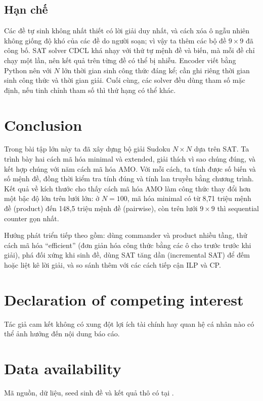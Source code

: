 \documentclass[a4paper,fleqn]{cas-sc}
\newcommand{\GithubURL}{}
\begin{document}
\subsection{Hạn chế}\label{sec:threats}

Các đề tự sinh không nhất thiết có lời giải duy nhất, và cách xóa ô ngẫu nhiên không giống độ khó của các đề do người soạn; vì vậy ta thêm các bộ đề $9\times9$ đã công bố. SAT solver CDCL khá nhạy với thứ tự mệnh đề và biến, mà mỗi đề chỉ chạy một lần, nên kết quả trên từng đề có thể bị nhiễu. Encoder viết bằng Python nên với $N$ lớn thời gian sinh công thức đáng kể; cần ghi riêng thời gian sinh công thức và thời gian giải. Cuối cùng, các solver đều dùng tham số mặc định, nếu tinh chỉnh tham số thì thứ hạng có thể khác.

\section{Conclusion}\label{sec:conclusion}

Trong bài tập lớn này ta đã xây dựng bộ giải Sudoku $N\times N$ dựa trên SAT. Ta trình bày hai cách mã hóa minimal và extended, giải thích vì sao chúng đúng, và kết hợp chúng với năm cách mã hóa AMO. Với mỗi cách, ta tính được số biến và số mệnh đề, đồng thời kiểm tra tính đúng và tính lan truyền bằng chương trình. Kết quả về kích thước cho thấy cách mã hóa AMO làm công thức thay đổi hơn một bậc độ lớn trên lưới lớn: ở $N=100$, mã hóa minimal có từ 8,71 triệu mệnh đề (product) đến 148,5 triệu mệnh đề (pairwise), còn trên lưới $9\times9$ thì sequential counter gọn nhất. \AutoConclusion

Hướng phát triển tiếp theo gồm: dùng commander và product nhiều tầng, thử cách mã hóa ``efficient'' (đơn giản hóa công thức bằng các ô cho trước trước khi giải), phá đối xứng khi sinh đề, dùng SAT tăng dần (incremental SAT) để đếm hoặc liệt kê lời giải, và so sánh thêm với các cách tiếp cận ILP và CP.

\section*{Declaration of competing interest}
Tác giả cam kết không có xung đột lợi ích tài chính hay quan hệ cá nhân nào có thể ảnh hưởng đến nội dung báo cáo.

\section*{Data availability}
Mã nguồn, dữ liệu, seed sinh đề và kết quả thô có tại \GithubURL.
\end{document}
